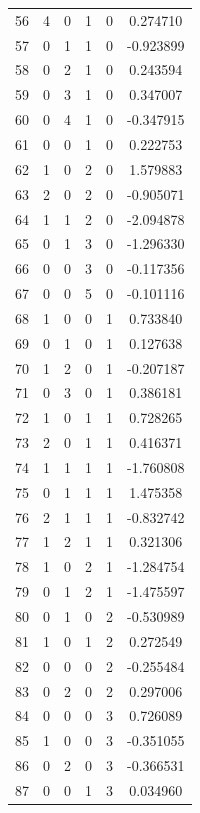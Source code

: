 \documentclass[preprint,12pt]{elsarticle}
\begin{document}
\begin{table}
\begin{minipage}[h!]{0.23\textwidth}
{\begin{tabular}{|c|ccccc|}
56 &   4 &   0 &   1 &   0 &   0.274710 \\
57 &   0 &   1 &   1 &   0 &  -0.923899 \\
58 &   0 &   2 &   1 &   0 &   0.243594 \\
59 &   0 &   3 &   1 &   0 &   0.347007 \\
60 &   0 &   4 &   1 &   0 &  -0.347915 \\
61 &   0 &   0 &   1 &   0 &   0.222753 \\
62 &   1 &   0 &   2 &   0 &   1.579883 \\
63 &   2 &   0 &   2 &   0 &  -0.905071 \\
64 &   1 &   1 &   2 &   0 &  -2.094878 \\
65 &   0 &   1 &   3 &   0 &  -1.296330 \\
66 &   0 &   0 &   3 &   0 &  -0.117356 \\
67 &   0 &   0 &   5 &   0 &  -0.101116 \\
68 &   1 &   0 &   0 &   1 &   0.733840 \\
69 &   0 &   1 &   0 &   1 &   0.127638 \\
70 &   1 &   2 &   0 &   1 &  -0.207187 \\
71 &   0 &   3 &   0 &   1 &   0.386181 \\
72 &   1 &   0 &   1 &   1 &   0.728265 \\
73 &   2 &   0 &   1 &   1 &   0.416371 \\
74 &   1 &   1 &   1 &   1 &  -1.760808 \\
75 &   0 &   1 &   1 &   1 &   1.475358 \\
76 &   2 &   1 &   1 &   1 &  -0.832742 \\
77 &   1 &   2 &   1 &   1 &   0.321306 \\
78 &   1 &   0 &   2 &   1 &  -1.284754 \\
79 &   0 &   1 &   2 &   1 &  -1.475597 \\
80 &   0 &   1 &   0 &   2 &  -0.530989 \\
81 &   1 &   0 &   1 &   2 &   0.272549 \\
82 &   0 &   0 &   0 &   2 &  -0.255484 \\
83 &   0 &   2 &   0 &   2 &   0.297006 \\
84 &   0 &   0 &   0 &   3 &   0.726089 \\
85 &   1 &   0 &   0 &   3 &  -0.351055 \\
86 &   0 &   2 &   0 &   3 &  -0.366531 \\
87 &   0 &   0 &   1 &   3 &   0.034960 \\

\end{tabular}}
\end{minipage}
\end{table}
\end{document}

